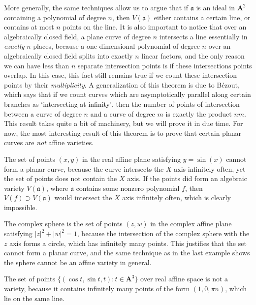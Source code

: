 More generally, the same techniques allow us to argue that if $\mathfrak{a}$ is an ideal in $\mathbf{A}^2$ containing a polynomial of degree $n$, then $V(\mathfrak{a})$ either contains a certain line, or contains at most $n$ points on the line. It is also important to notice that over an algebraically closed field, a plane curve of degree $n$ intersects a line essentially in {\it exactly} $n$ places, because a one dimensional polynomial of degree $n$ over an algebraically closed field splits into exactly $n$ linear factors, and the only reason we can have less than $n$ separate intersection points is if these intersections points overlap. In this case, this fact still remains true if we count these intersection points by their {\it multiplicity}. A generalization of this theorem is due to B\'{e}zout, which says that if we count curves which are asymptotically parallel along certain branches as `intersecting at infinity', then the number of points of intersection between a curve of degree $n$ and a curve of degree $m$ is exactly the product $nm$. This result takes quite a bit of machinery, but we will prove it in due time. For now, the most interesting result of this theorem is to prove that certain planar curves are {\it not} affine varieties.

\begin{example}
    The set of points $(x,y)$ in the real affine plane satisfying $y = \sin(x)$ cannot form a planar curve, because the curve intersects the $X$ axis infinitely often, yet the set of points does not contain the $X$ axis. If the points did form an algebraic variety $V(\mathfrak{a})$, where $\mathfrak{a}$ contains some nonzero polynomial $f$, then $V(f) \supset V(\mathfrak{a})$ would intersect the $X$ axis infinitely often, which is clearly impossible.
\end{example}

\begin{example}
    The complex sphere is the set of points $(z,w)$ in the complex affine plane satisfying $|z|^2 + |w|^2 = 1$, because the intersection of the complex sphere with the $z$ axis forms a circle, which has infinitely many points. This justifies that the set cannot form a planar curve, and the same technique as in the last example shows the sphere cannot be an affine variety in general.
\end{example}

\begin{example}
    The set of points $\{ (\cos t, \sin t, t): t \in \mathbf{A}^3 \}$ over real affine space is not a variety, because it contains infinitely many points of the form $(1,0,\pi n)$, which lie on the same line.
\end{example}

